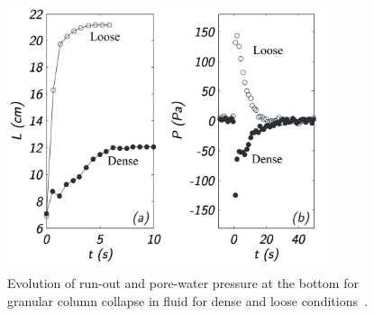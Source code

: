 \begin{figure}[htbp]
\centering
\includegraphics[width=0.85\textwidth]{Runout_PWP_Fluid_Exp}
\caption{Evolution of run-out and pore-water pressure at the bottom for 
granular column collapse in fluid for dense and loose 
conditions~\citep{Rondon2011}.}
\label{fig:Runout_PWP_Fluid_Exp}
\end{figure}

